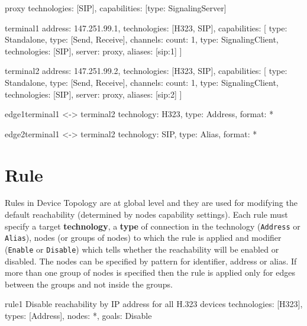 \begin{TopologyExample}{proxy}{}
technologies: [SIP],
capabilities: [{type: SignalingServer}]
\end{TopologyExample}

\begin{TopologyExample}{terminal1}{}
address: 147.251.99.1,
technologies: [H323, SIP],
capabilities: [
  {type: Standalone},
  {type: [Send, Receive], channels: {count: 1}}, 
  {type: SignalingClient, technologies: [SIP], server: proxy, aliases: [sip:1]}
]
\end{TopologyExample}

\begin{TopologyExample}{terminal2}{}
address: 147.251.99.2,
technologies: [H323, SIP],
capabilities: [
  {type: Standalone},
  {type: [Send, Receive], channels: {count: 1}}, 
  {type: SignalingClient, technologies: [SIP], server: proxy, aliases: [sip:2]}
]
\end{TopologyExample}

\begin{TopologyExample}{edge1}{terminal1 <-> terminal2}
technology: H323,
type: Address,
format: *
\end{TopologyExample}

\begin{TopologyExample}{edge2}{terminal1 <-> terminal2}
technology: SIP,
type: Alias,
format: *
\end{TopologyExample} 
  
  
\section{Rule}
Rules in Device Topology are at global level and they are used for modifying 
the default reachability (determined by nodes capability settings). Each rule 
must specify a target \textbf{technology}, a \textbf{type} of connection in 
the technology (\verb|Address| or \verb|Alias|), nodes (or groups of nodes) 
to which the rule is applied and modifier (\verb|Enable| or \verb|Disable|) 
which tells whether the reachability will be enabled or disabled. The nodes 
can be specified by pattern for identifier, address or alias. If more than 
one group of nodes is specified then the rule is applied only for edges 
between the groups and not inside the groups.

\begin{TopologyExample}{rule1}%
      {Disable reachability by IP address for all H.323 devices}
technologies: [H323],
types: [Address],
nodes: *,
goals: Disable
\end{TopologyExample}

